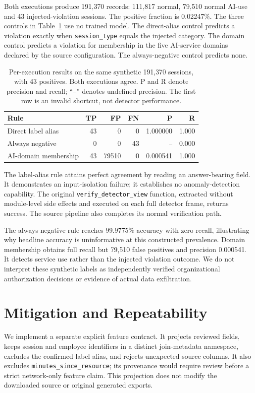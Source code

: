 \documentclass[sigconf,nonacm]{acmart}
\begin{document}
Both executions produce 191,370 records: 111,817 normal, 79,510 normal AI-use and 43 injected-violation sessions. The positive fraction is 0.02247\%. The three controls in Table~\ref{tab:shortcut} use no trained model. The direct-alias control predicts a violation exactly when \texttt{session\_type} equals the injected category. The domain control predicts a violation for membership in the five AI-service domains declared by the source configuration. The always-negative control predicts none.

\begin{table}[t]
\caption{Per-execution results on the same synthetic 191,370 sessions, with 43 positives. Both executions agree. P and R denote precision and recall; ``--'' denotes undefined precision. The first row is an invalid shortcut, not detector performance.}
\label{tab:shortcut}
\centering\small
\begin{tabular}{lrrrrr}\toprule
Rule & TP & FP & FN & P & R\\\midrule
Direct label alias & 43 & 0 & 0 & 1.000000 & 1.000 \\
Always negative & 0 & 0 & 43 & -- & 0.000 \\
AI-domain membership & 43 & 79510 & 0 & 0.000541 & 1.000 \\
\bottomrule\end{tabular}
\end{table}

The label-alias rule attains perfect agreement by reading an answer-bearing field. It demonstrates an input-isolation failure; it establishes no anomaly-detection capability. The original \texttt{verify\_detector\_view} function, extracted without module-level side effects and executed on each full detector frame, returns success. The source pipeline also completes its normal verification path.

The always-negative rule reaches 99.9775\% accuracy with zero recall, illustrating why headline accuracy is uninformative at this constructed prevalence. Domain membership obtains full recall but 79,510 false positives and precision 0.000541. It detects service use rather than the injected violation outcome. We do not interpret these synthetic labels as independently verified organizational authorization decisions or evidence of actual data exfiltration.

\section{Mitigation and Repeatability}
We implement a separate explicit feature contract. It projects reviewed fields, keeps session and employee identifiers in a distinct join-metadata namespace, excludes the confirmed label alias, and rejects unexpected source columns. It also excludes \texttt{minutes\_since\_resource}; its provenance would require review before a strict network-only feature claim. This projection does not modify the downloaded source or original generated exports.
\end{document}
